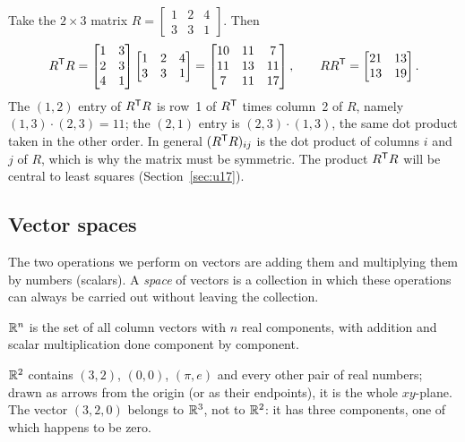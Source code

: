 \begin{example}\label{ex:u06-RTR}
Take the $2\times3$ matrix $R=\begin{bmatrix} 1&2&4\\ 3&3&1\end{bmatrix}$. Then
\[
  R^{\mathsf{T}} R=\begin{bmatrix} 1&3\\ 2&3\\ 4&1\end{bmatrix}\begin{bmatrix} 1&2&4\\ 3&3&1\end{bmatrix}
  =\begin{bmatrix} 10&11&7\\ 11&13&11\\ 7&11&17\end{bmatrix},\qquad
  RR^{\mathsf{T}}=\begin{bmatrix} 21&13\\ 13&19\end{bmatrix}.
\]
The $(1,2)$ entry of $R^{\mathsf{T}} R$ is row~1 of $R^{\mathsf{T}}$ times column~2 of $R$, namely
$(1,3)\cdot(2,3)=11$; the $(2,1)$ entry is $(2,3)\cdot(1,3)$, the same dot product taken in
the other order. In general $(R^{\mathsf{T}} R)_{ij}$ is the dot product of columns $i$ and $j$ of $R$,
which is why the matrix must be symmetric. The product $R^{\mathsf{T}} R$ will be central to least
squares (Section~\ref{sec:u17}).
\end{example}

\subsection{Vector spaces}

The two operations we perform on vectors are adding them and multiplying them by
numbers (scalars). A \emph{space} of vectors is a collection in which these operations can
always be carried out without leaving the collection.

\begin{definition}\label{def:u06-Rn}
$\mathbb{R}^n$ is the set of all column vectors with $n$ real components, with addition and scalar
multiplication done component by component.
\end{definition}

$\mathbb{R}^2$ contains $(3,2)$, $(0,0)$, $(\pi,e)$ and every other pair of real numbers; drawn as
arrows from the origin (or as their endpoints), it is the whole $xy$-plane. The vector
$(3,2,0)$ belongs to $\mathbb{R}^3$, not to $\mathbb{R}^2$: it has three components, one of which happens to
be zero.

